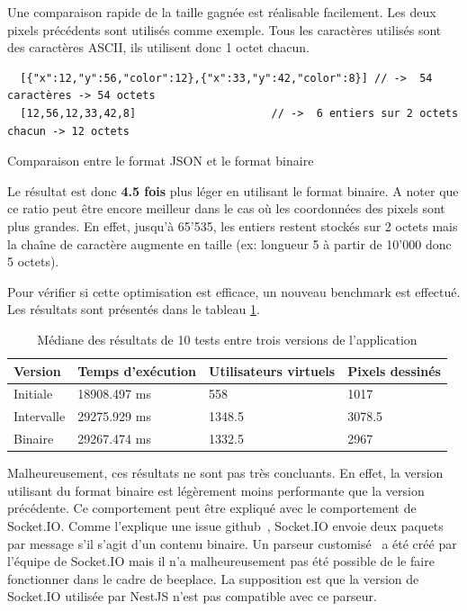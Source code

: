Une comparaison rapide de la taille gagnée est réalisable facilement. Les deux pixels précédents sont utilisés comme exemple. Tous les caractères utilisés sont des caractères ASCII, ils utilisent donc 1 octet chacun.

\begin{listing}[H]
  \begin{verbatim}
  [{"x":12,"y":56,"color":12},{"x":33,"y":42,"color":8}] // ->  54 caractères -> 54 octets
  [12,56,12,33,42,8]                     // ->  6 entiers sur 2 octets chacun -> 12 octets
\end{verbatim}
  \caption{Comparaison entre le format JSON et le format binaire}
  \label{listing:json-vs-binary}
\end{listing}

Le résultat est donc \textbf{4.5 fois} plus léger en utilisant le format binaire. A noter que ce ratio peut être encore meilleur dans le cas où les coordonnées des pixels sont plus grandes. En effet, jusqu'à 65'535, les entiers restent stockés sur 2 octets mais la chaîne de caractère augmente en taille (ex: longueur 5 à partir de 10'000 donc 5 octets).

Pour vérifier si cette optimisation est efficace, un nouveau benchmark est effectué. Les résultats sont présentés dans le tableau \ref{table:second-opti-results}.

\begin{table}[H]
  \centering
  \begin{tabular}{|l|l|l|l|}
    \hline
    \textbf{Version} & \textbf{Temps d'exécution} & \textbf{Utilisateurs virtuels} & \textbf{Pixels dessinés} \\ \hline
    Initiale         & 18908.497 ms               & 558                            & 1017                     \\ \hline
    Intervalle       & 29275.929 ms               & 1348.5                         & 3078.5                   \\ \hline
    Binaire          & 29267.474 ms               & 1332.5                         & 2967                     \\ \hline
  \end{tabular}
  \caption{Médiane des résultats de 10 tests entre trois versions de l'application}
  \label{table:second-opti-results}
\end{table}

Malheureusement, ces résultats ne sont pas très concluants. En effet, la version utilisant du format binaire est légèrement moins performante que la version précédente. Ce comportement peut être expliqué avec le comportement de Socket.IO. Comme l'explique une issue \gls{github}~\cite{socket-io-binary-issue}, Socket.IO envoie deux paquets par message s'il s'agit d'un contenu binaire. Un parseur customisé~\cite{socket-io-msgpack-parser} a été créé par l'équipe de Socket.IO mais il n'a malheureusement pas été possible de le faire fonctionner dans le cadre de \gls{beeplace}. La supposition est que la version de Socket.IO utilisée par NestJS n'est pas compatible avec ce parseur.


